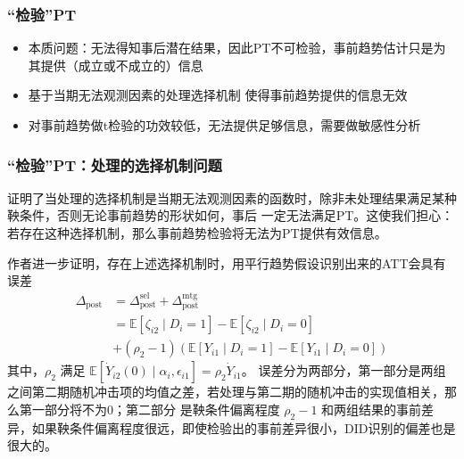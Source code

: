 \documentclass[../didNotes.tex]{subfiles}
\begin{document}
\begin{frame}
  \frametitle{``检验''PT}

  \begin{itemize}
    \item 本质问题：无法得知事后潜在结果，因此PT不可检验，事前趋势估计只是为其提供（成立或不成立的）信息
    \item 基于当期无法观测因素的处理选择机制 \parencite{ghanem2025} 使得事前趋势提供的信息无效
    \item 对事前趋势做t检验的功效较低，无法提供足够信息，需要做敏感性分析 \parencite{roth2022a,rambachan2023}
  \end{itemize}

\end{frame}

\begin{frame}
  \frametitle{``检验''PT：处理的选择机制问题}

  \textcite{ghanem2025} 证明了当处理的选择机制是当期无法观测因素的函数时，除非未处理结果满足某种鞅条件，否则无论事前趋势的形状如何，事后
  一定无法满足PT。这使我们担心：若存在这种选择机制，那么事前趋势检验将无法为PT提供有效信息。

  \vspace{1em}

  作者进一步证明，存在上述选择机制时，用平行趋势假设识别出来的ATT会具有误差
  \begin{align*}
    \Delta_{\text{post}} & = \Delta_{\text{post}}^{\text{sel}} + \Delta_{\text{post}}^{\text{mtg}}
    \\
    & = \mathbb{E}[\zeta_{i 2} \mid D_{i}=1] - \mathbb{E}[\zeta_{i 2} \mid D_{i}=0]                   \\
    & + (\rho_{2}-1) \left(\mathbb{E}[Y_{i 1} \mid D_{i}=1] - \mathbb{E}[Y_{i 1} \mid D_{i}=0]\right)
  \end{align*}
  其中，$\rho_{2}$ 满足 $\mathbb{E}[\dot{Y}_{i 2}(0) \mid \alpha_{i}, \epsilon_{i 1}]=\rho_{2} \dot{Y}_{i 1}$。
  误差分为两部分，第一部分是两组之间第二期随机冲击项的均值之差，若处理与第二期的随机冲击的实现值相关，那么第一部分将不为0；第二部分
  是鞅条件偏离程度 $\rho_{2}-1$ 和两组结果的事前差异，如果鞅条件偏离程度很远，即使检验出的事前差异很小，DID识别的偏差也是很大的。

\end{frame}
\end{document}
